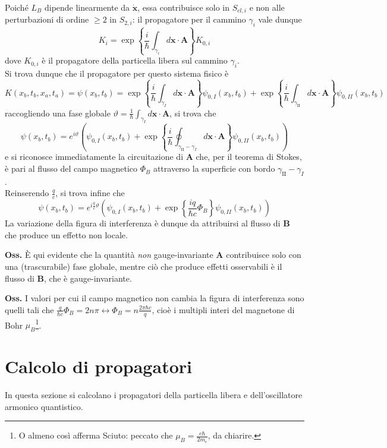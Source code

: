 Poiché $L_B$ dipende linearmente da $\mathbf{\dot x}$, essa contribuisce solo in $S_{cl,i}$ e non
alle perturbazioni di ordine $\geq2$ in $S_{2,i}$: il propagatore per il cammino $\gamma_i$ vale dunque
$$K_i = \exp\left\{\frac{i}{\hbar}\int_{\gamma_i}d\mathbf{x}\cdot\mathbf{A}\right\}K_{0,i}$$
dove $K_{0,i}$ è il propagatore della particella libera sul cammino $\gamma_i$.\\
Si trova dunque che il propagatore per questo sistema fisico è
$$K(x_b,t_b,x_a,t_a) = \psi(x_b,t_b) =
\exp\left\{\frac{i}{\hbar}\int_{\gamma_I}d\mathbf{x}\cdot\mathbf{A}\right\}\psi_{0,I}(x_b,t_b) +
\exp\left\{\frac{i}{\hbar}\int_{\gamma_\text{II}}d\mathbf{x}\cdot\mathbf{A}\right\}\psi_{0,II}(x_b,t_b)$$
raccogliendo una fase globale $\vartheta=\frac{1}{\hbar}\int_{\gamma_I}^{}d\mathbf{x}\cdot\mathbf{A}$,
si trova che
$$\psi(x_b,t_b) = e^{i\vartheta}\left(\psi_{0,I}(x_b,t_b) +
\exp\left\{\frac{i}{\hbar}\oint_{\gamma_\text{II}-\gamma_I} d\mathbf{x}\cdot\mathbf{A}\right\}
\psi_{0,II}(x_b,t_b)\right)$$
e si riconosce immediatamente la circuitazione di \textbf{A} che, per il teorema di Stokes, è pari 
al flusso del campo magnetico $\Phi_B$ attraverso la superficie con bordo $\gamma_\text{II}-\gamma_I$.\\
Reinserendo $\frac{q}{c}$, si trova infine che
$$\boxed{\psi(x_b,t_b)=e^{i\frac{q}{c}\vartheta}\left(\psi_{0,I}(x_b,t_b)+\exp\left\{\frac{iq}{\hbar c}
\Phi_B\right\}\psi_{0,II}(x_b,t_b)\right)}$$
La variazione della figura di interferenza è dunque da attribuirsi al flusso di \textbf{B} che produce
un effetto non locale.

\textbf{Oss.} È qui evidente che la quantità \textit{non} gauge-invariante \textbf{A} contribuisce solo
con una (trascurabile) fase globale, mentre ciò che produce effetti osservabili è il flusso di
\textbf{B}, che è gauge-invariante.

\textbf{Oss.} I valori per cui il campo magnetico non cambia la figura di interferenza sono quelli tali
che $\frac{q}{\hbar c}\Phi_B = 2n\pi \leftrightarrow \Phi_B = n\frac{2\pi\hbar c}{q}$, cioè i multipli
interi del magnetone di Bohr $\mu_B$\footnote{O almeno così afferma Sciuto: peccato
che $\mu_B = \frac{e\hbar}{2m_e}$, da chiarire.}.
\section{Calcolo di propagatori}
In questa sezione si calcolano i propagatori della particella libera e dell'oscillatore armonico
quantistico.
